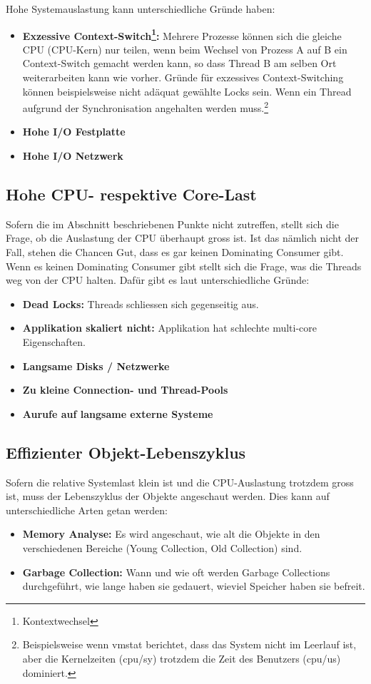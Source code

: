 Hohe Systemauslastung kann unterschiedliche Gründe haben: 
\begin{itemize}
\item \textbf{Exzessive Context-Switch\footnote{Kontextwechsel}:} Mehrere Prozesse können sich die gleiche CPU (CPU-Kern) nur teilen, wenn beim Wechsel von Prozess A auf B ein Context-Switch gemacht werden kann, so dass Thread B am selben Ort weiterarbeiten kann wie vorher. Gründe für exzessives Context-Switching können beispielsweise nicht adäquat gewählte Locks sein. Wenn ein Thread aufgrund der Synchronisation angehalten werden muss.\footnote{Beispielsweise wenn vmstat berichtet, dass das System nicht im Leerlauf ist, aber die Kernelzeiten (cpu/sy) trotzdem die Zeit des Benutzers (cpu/us) dominiert.}
\item \textbf{Hohe I/O Festplatte} 
\item \textbf{Hohe I/O Netzwerk} 
\end{itemize}


\subsection{Hohe CPU- respektive Core-Last}
Sofern die im Abschnitt  beschriebenen Punkte nicht zutreffen, stellt sich die Frage, ob die Auslastung der CPU überhaupt gross ist. Ist das nämlich nicht der Fall, stehen die Chancen Gut, dass es gar keinen Dominating Consumer gibt. Wenn es keinen Dominating Consumer gibt stellt sich die Frage, was die Threads weg von der CPU halten. Dafür gibt es laut \cite{pepperdine201102} unterschiedliche Gründe:
\begin{itemize}
\item \textbf{Dead Locks: } Threads schliessen sich gegenseitig aus. 
\item \textbf{Applikation skaliert nicht: } Applikation hat schlechte multi-core Eigenschaften.
\item \textbf{Langsame Disks / Netzwerke}
\item \textbf{Zu kleine Connection- und Thread-Pools}
\item \textbf{Aurufe auf langsame externe Systeme}
\end{itemize}


\subsection{Effizienter Objekt-Lebenszyklus}
Sofern die relative Systemlast klein ist und die CPU-Auslastung trotzdem gross ist, muss der Lebenszyklus der Objekte angeschaut werden. Dies kann auf unterschiedliche Arten getan werden:
\begin{itemize}
\item \textbf{Memory Analyse: }Es wird angeschaut, wie alt die Objekte in den verschiedenen Bereiche (Young Collection, Old Collection) sind. 
\item \textbf{Garbage Collection: }Wann und wie oft werden Garbage Collections durchgeführt, wie lange haben sie gedauert, wieviel Speicher haben sie befreit.
\end{itemize}

